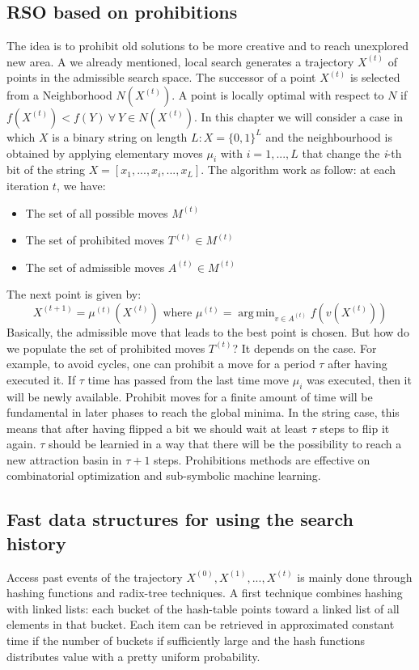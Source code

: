 \documentclass[11pt]{article}
\DeclareMathOperator*{\argmin}{arg\,min}
\begin{document}
\subsection{RSO based on prohibitions}
The idea is to prohibit old solutions to be more creative and to reach unexplored new area. A we already mentioned, local search generates a trajectory $X^{(t)}$ of points in the admissible search space. The successor of a point $X^{(t)}$ is selected from a Neighborhood $N(X^{(t)})$. A point is locally optimal with respect to $N$ if $f(X^{(t)}) < f(Y) \ \forall \ Y \in N(X^{(t)})$. In this chapter we will consider a case in which $X$ is a binary string on length $L: X = \{0,1\}^L$ and the neighbourhood is obtained by applying elementary moves $\mu_{i}$ with $i = 1,...,L$ that change the \textit{i}-th bit of the string $X = [x_{1},...,x_{i},...,x_{L}]$. The algorithm work as follow: at each iteration $t$, we have:
\begin{itemize}
\item{The set of all possible moves $M^{(t)}$}
\item{The set of prohibited moves $T^{(t)} \in M^{(t)}$}
\item{The set of admissible moves $A^{(t)} \in M^{(t)}$}
\end{itemize}
The next point is given by:
$$
X^{(t+1)} = \mu^{(t)}(X^{(t)}) \text{ where } \mu^{(t)} = \argmin_{v \in A^{(t)}} f(v(X^{(t)}))
$$
Basically, the admissible move that leads to the best point is chosen. But how do we populate the set of prohibited moves $T^{(t)}$? It depends on the case. For example, to avoid cycles, one can prohibit a move for a period $\tau$ after having executed it. If $\tau$ time has passed from the last time move $\mu_{i}$ was executed, then it will be newly available. Prohibit moves for a finite amount of time will be fundamental in later phases to reach the global minima. In the string case, this means that after having flipped a bit we should wait at least $\tau$ steps to flip it again. $\tau$ should be learnied in a way that there will be the possibility to reach a new attraction basin in $\tau + 1$ steps. Prohibitions methods are effective on combinatorial optimization and sub-symbolic machine learning.

\subsection{Fast data structures for using the search history}
Access past events of the trajectory $X^{(0)}, X^{(1)}, ..., X^{(t)}$ is mainly done through hashing functions and radix-tree techniques. A first technique combines hashing with linked lists: each bucket of the hash-table points toward a linked list of all elements in that bucket. Each item can be retrieved in approximated constant time if the number of buckets if sufficiently large and the hash functions distributes value with a pretty uniform probability.
\end{document}
